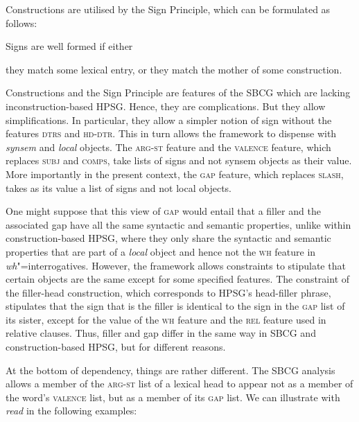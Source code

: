 \documentclass[output=paper
                ,modfonts
                ,nonflat
	        ,collection
	        ,collectionchapter
	        ,collectiontoclongg
 	        ,biblatex
                ,babelshorthands
                ,newtxmath
                ,draftmode
                ,colorlinks, citecolor=brown
]{./langsci/langscibook}
\begin{document}
{\begin{exe}
\end{exe}
\noindent
Constructions are utilised by the Sign Principle, which can be
formulated as follows:

\begin{exe}
  \ex \label{ex:UDC:SBCG:SignPrinciple} Signs are well formed if either

  \begin{xlist}
    \ex they match some lexical entry, or \ex they match the mother of
    some construction.
  \end{xlist}
\end{exe}

\noindent
Constructions and the Sign Principle are features of the SBCG which
are lacking inconstruction-based HPSG. Hence, they are
complications. But they allow simplifications. In particular, they
allow a simpler notion of sign without the features \textsc{dtrs} and
\textsc{hd-dtr}. This in turn allows the framework to dispense with
\textit{synsem} and \textit{local} objects. The \textsc{arg-st}
feature and the \textsc{valence} feature, which replaces \textsc{subj}
and \textsc{comps}, take lists of signs and not synsem objects as
their value. More importantly in the present context, the \textsc{gap}
feature, which replaces \textsc{slash}, takes as its value a list of
signs and not local objects.

One might suppose that this view of \textsc{gap} would entail that a
filler and the associated gap have all the same syntactic and semantic
properties, unlike within construction-based HPSG, where they only
share the syntactic and semantic properties that are part of a
\textit{local} object and hence not the \textsc{wh} feature in
\emph{wh}"=interrogatives. However, the framework allows constraints
to stipulate that certain objects are the same except for some
specified features. The constraint of the filler-head construction,
which corresponds to HPSG’s head-filler phrase, stipulates that the
sign that is the filler is identical to the sign in the \textsc{gap}
list of its sister, except for the value of the \textsc{wh} feature
and the \textsc{rel} feature used in relative clauses. Thus, filler
and gap differ in the same way in SBCG and construction-based HPSG,
but for different reasons.

At the bottom of dependency, things are rather different. The SBCG
analysis allows a member of the \textsc{arg-st} list of a lexical head
to appear not as a member of the word’s \textsc{valence} list, but as
a member of its \textsc{gap} list. We can illustrate with
\textit{read} in the following examples:

}
\end{document}
